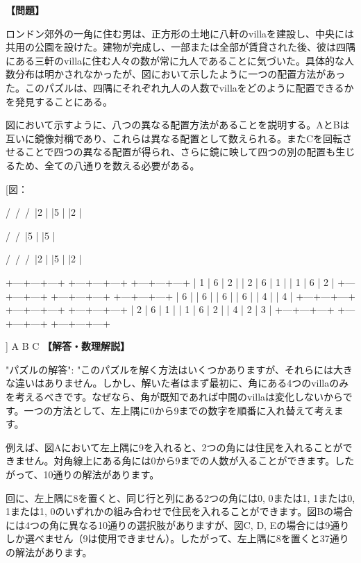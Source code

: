 \documentclass[10pt,a4paper,oneside,openany]{ltjsbook}
\begin{document}
\begin{tcolorbox}[colback=softblue,colframe=primaryblue,title=\textbf{第 276 問：THE EIGHT VILLAS.},arc=2mm,boxrule=1pt,breakable]
\textbf{【問題】}\par\vspace{0.3em}
ロンドン郊外の一角に住む男は、正方形の土地に八軒のvillaを建設し、中央には共用の公園を設けた。建物が完成し、一部または全部が賃貸された後、彼は四隅にある三軒のvillaに住む人々の数が常に九人であることに気づいた。具体的な人数分布は明かされなかったが、図において示したように一つの配置方法があった。このパズルは、四隅にそれぞれ九人の人数でvillaをどのように配置できるかを発見することにある。

図において示すように、八つの異なる配置方法があることを説明する。AとBは互いに鏡像対稱であり、これらは異なる配置として数えられる。またCを回転させることで四つの異なる配置が得られ、さらに鏡に映して四つの別の配置も生じるため、全ての八通りを数える必要がある。

[図：

     /\      /\      /\
    |2 |    |5 |    |2 |

     /\              /\
    |5 |            |5 |

     /\      /\      /\
    |2 |    |5 |    |2 |

    +---+---+---+    +---+---+---+    +---+---+---+
    | 1 | 6 | 2 |    | 2 | 6 | 1 |    | 1 | 6 | 2 |
    +---+---+---+    +---+---+---+    +---+---+---+
    | 6 |   | 6 |    | 6 |   | 6 |    | 4 |   | 4 |
    +---+---+---+    +---+---+---+    +---+---+---+
    | 2 | 6 | 1 |    | 1 | 6 | 2 |    | 4 | 2 | 3 |
    +---+---+---+    +---+---+---+    +---+---+---+

] A                B                C
\tcblower
\textbf{【解答・数理解説】}\par\vspace{0.3em}
{
    "パズルの解答": "このパズルを解く方法はいくつかありますが、それらには大きな違いはありません。しかし、解いた者はまず最初に、角にある4つのvillaのみを考えるべきです。なぜなら、角が既知であれば中間のvillaは変化しないからです。一つの方法として、左上隅に0から9までの数字を順番に入れ替えて考えます。

例えば、図Aにおいて左上隅に9を入れると、2つの角には住民を入れることができません。対角線上にある角には0から9までの人数が入ることができます。したがって、10通りの解法があります。

回に、左上隅に8を置くと、同じ行と列にある2つの角には0, 0または1, 1または0, 1または1, 0のいずれかの組み合わせで住民を入れることができます。図Bの場合には4つの角に異なる10通りの選択肢がありますが、図C, D, Eの場合には9通りしか選べません（9は使用できません）。したがって、左上隅に8を置くと37通りの解法があります。

}
\end{tcolorbox}
\end{document}
